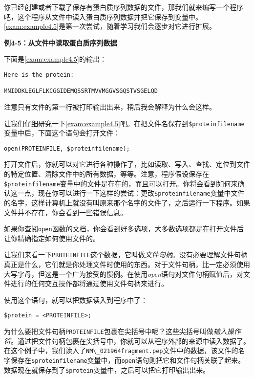 你已经创建或者下载了保存有蛋白质序列数据的文件，那我们就来编写一个程序吧，这个程序从文件中读入蛋白质序列数据并把它保存到变量中。\autoref{exam:example4.5}是第一次尝试，随着学习我们会逐步对它进行扩展。

\textbf{例4-5：从文件中读取蛋白质序列数据}



下面是\autoref{exam:example4.5}的输出：

\begin{lstlisting}
Here is the protein:

MNIDDKLEGLFLKCGGIDEMQSSRTMVVMGGVSGQSTVSGELQD
\end{lstlisting}

注意只有文件的第一行被打印输出出来，稍后我会解释为什么会这样。

让我们仔细研究一下\autoref{exam:example4.5}吧。在把文件名保存到\verb|$proteinfilename|变量中后，下面这个语句会打开文件：

\begin{lstlisting}
open(PROTEINFILE, $proteinfilename);
\end{lstlisting}

打开文件后，你就可以对它进行各种操作了，比如读取、写入、查找、定位到文件的特定位置、清除文件中的所有数据，等等。注意，程序假设保存在\verb|$proteinfilename|变量中的文件是存在的，而且可以打开。你将会看到如何来确认这一点，现在你可以进行一下这样的尝试：更改\verb|$proteinfilename|变量中文件的名字，这样计算机上就没有叫原来那个名字的文件了，之后运行一下程序。如果文件并不存在，你会看到一些错误信息。

如果你查阅\verb|open|函数的文档，你会看到好多选项，大多数选项都是在打开文件后让你精确指定如何使用文件的。

让我们来看一下\verb|PROTEINFILE|这个数据，它叫做\textit{文件句柄}。没有必要理解文件句柄真正是什么，它们就是你处理文件时使用的东西。对于文件句柄，比一定必须使用大写字母，但这是一个广为接受的惯例。在使用\textit{open}语句对文件句柄赋值后，对文件进行的任何交互操作都将通过使用文件句柄来进行。

使用这个语句，就可以把数据读入到程序中了：

\begin{lstlisting}
$protein = <PROTEINFILE>;
\end{lstlisting}

为什么要把文件句柄\verb|PROTEINFILE|包裹在尖括号中呢？这些尖括号叫做\textit{输入操作符}。通过把文件句柄包裹在尖括号中，你就可以从程序外部的来源中读入数据了。在这个例子中，我们读入了\verb|NM\_021964fragment.pep|文件中的数据，该文件的名字保存在\verb|$proteinfilename|变量中，而\verb|open|语句则把它和文件句柄关联了起来。数据现在就保存到了\verb|$protein|变量中，之后可以把它打印输出出来。

